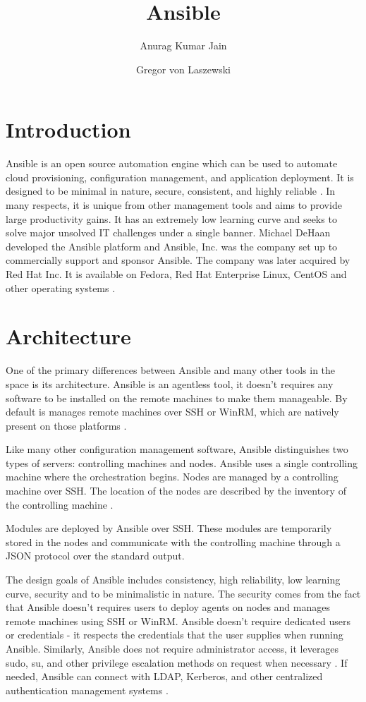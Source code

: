 \documentclass[9pt,twocolumn,twoside]{styles/osajnl}
\title{Ansible}
\author[1]{Anurag Kumar Jain}
\author[1,*]{Gregor von Laszewski}
\affil[1]{School of Informatics and Computing, Bloomington, IN 47408, U.S.A.}
\affil[*]{Corresponding authors: laszewski@gmail.com}
\begin{document}
\maketitle

\section{Introduction}

Ansible is an open source automation engine which can be used to
automate cloud provisioning, configuration management, and application
deployment. It is designed to be minimal in nature, secure,
consistent, and highly reliable \cite{www-ansible3}. In many respects,
it is unique from other management tools and aims to provide large
productivity gains. It has an extremely low learning curve and seeks
to solve major unsolved IT challenges under a single banner.  Michael
DeHaan developed the Ansible platform and Ansible, Inc. was the
company set up to commercially support and sponsor Ansible. The
company was later acquired by Red Hat Inc. It is available on Fedora,
Red Hat Enterprise Linux, CentOS and other operating
systems \cite{www-ansible-wikipedia}.

\section{Architecture}

One of the primary differences between Ansible and many other tools in
the space is its architecture. Ansible is an agentless tool, it
doesn't requires any software to be installed on the remote machines
to make them manageable. By default is manages remote machines over
SSH or WinRM, which are natively present on those
platforms \cite{www-ansible}.

Like many other configuration management software, Ansible
distinguishes two types of servers: controlling machines and
nodes. Ansible uses a single controlling machine where the
orchestration begins. Nodes are managed by a controlling machine over
SSH. The location of the nodes are described by the inventory of the
controlling machine \cite{www-ansible3}.

Modules are deployed by Ansible over SSH. These modules are
temporarily stored in the nodes and communicate with the controlling
machine through a JSON protocol over the standard
output.\cite{www-ansible}

The design goals of Ansible includes consistency, high reliability,
low learning curve, security and to be minimalistic in nature. The
security comes from the fact that Ansible doesn't requires users to
deploy agents on nodes and manages remote machines using SSH or
WinRM. Ansible doesn't require dedicated users or credentials - it
respects the credentials that the user supplies when running
Ansible. Similarly, Ansible does not require administrator access, it
leverages sudo, su, and other privilege escalation methods on request
when necessary \cite{github-ansible}. If needed, Ansible can connect
with LDAP, Kerberos, and other centralized authentication management
systems \cite{www-ansible2}.
\end{document}
